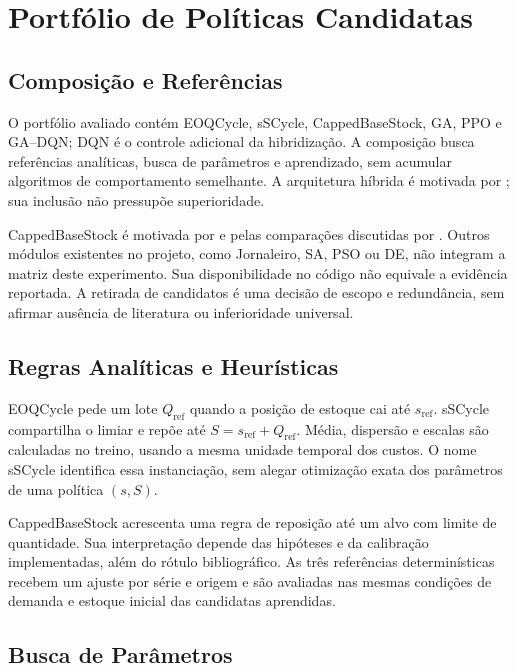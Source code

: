 \section{Portfólio de Políticas Candidatas}
\label{sec:benchmark_massivo}
\subsection{Composição e Referências}
\label{sec:portfolio_ampliado}

O portfólio avaliado contém EOQCycle, sSCycle, CappedBaseStock, GA, PPO e GA--DQN; DQN é o controle adicional da hibridização. A composição busca referências analíticas, busca de parâmetros e aprendizado, sem acumular algoritmos de comportamento semelhante. A arquitetura híbrida é motivada por \citet{Zabraoui2025GaDQN}; sua inclusão não pressupõe superioridade.

CappedBaseStock é motivada por \citet{Xin2021CappedBaseStock} e pelas comparações discutidas por \citet{Temizoz2025DeepControlledLearning}. Outros módulos existentes no projeto, como Jornaleiro, SA, PSO ou DE, não integram a matriz deste experimento. Sua disponibilidade no código não equivale a evidência reportada. A retirada de candidatos é uma decisão de escopo e redundância, sem afirmar ausência de literatura ou inferioridade universal.

\subsection{Regras Analíticas e Heurísticas}

EOQCycle pede um lote $Q_{\mathrm{ref}}$ quando a posição de estoque cai até $s_{\mathrm{ref}}$. sSCycle compartilha o limiar e repõe até $S=s_{\mathrm{ref}}+Q_{\mathrm{ref}}$. Média, dispersão e escalas são calculadas no treino, usando a mesma unidade temporal dos custos. O nome sSCycle identifica essa instanciação, sem alegar otimização exata dos parâmetros de uma política $(s,S)$.

CappedBaseStock acrescenta uma regra de reposição até um alvo com limite de quantidade. Sua interpretação depende das hipóteses e da calibração implementadas, além do rótulo bibliográfico. As três referências determinísticas recebem um ajuste por série e origem e são avaliadas nas mesmas condições de demanda e estoque inicial das candidatas aprendidas.

\subsection{Busca de Parâmetros}

